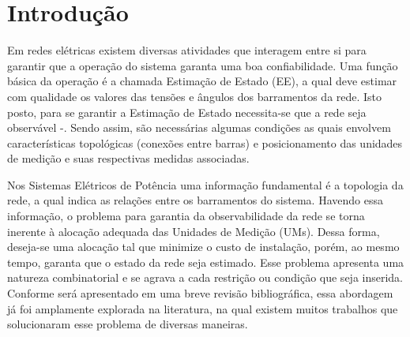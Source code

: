 \documentclass[12pt]{article}
\begin{document}

\section{Introdução}

Em redes elétricas existem diversas atividades que interagem entre si para garantir que a operação do sistema garanta uma boa confiabilidade. Uma função básica da operação é a chamada Estimação de Estado (EE), a qual deve estimar com qualidade os valores das tensões e ângulos dos barramentos da rede. Isto posto, para se garantir a Estimação de Estado necessita-se que a rede seja observável \cite{Abur04}-\cite{Mont99}. Sendo assim, são necessárias algumas condições as quais envolvem características topológicas (conexões entre barras) e posicionamento das unidades de medição e suas respectivas medidas associadas.

Nos Sistemas Elétricos de Potência uma informação fundamental é a topologia da rede, a qual indica as relações entre os barramentos do sistema. Havendo essa informação, o problema para garantia da observabilidade da rede se torna inerente à alocação adequada das Unidades de Medição (UMs). Dessa forma, deseja-se uma alocação tal que minimize o custo de instalação, porém, ao mesmo tempo, garanta que o estado da rede seja estimado. Esse problema apresenta uma natureza combinatorial e se agrava a cada restrição ou condição que seja inserida. Conforme será apresentado em uma breve revisão bibliográfica, essa abordagem já foi amplamente explorada na literatura, na qual existem muitos trabalhos que solucionaram esse problema de diversas maneiras.
\end{document}
